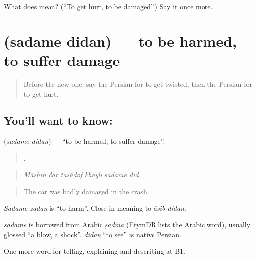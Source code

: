 \begin{tcolorbox}[breakable,colback=teal!4,colframe=teal!35!black,title={Before you move on}]
What does   mean? (\textquotedblleft{}To get hurt, to be damaged\textquotedblright{}.) Say it once more.
\end{tcolorbox}
\section[\texorpdfstring{\fa{صدمه} \fa{دیدن} (sadame didan)}{صدمه دیدن (sadame didan)}]{  (sadame didan) — to be harmed, to suffer damage}

\label{lesson:FA-C325-sadame-didan}



\begin{quote}
Before the new one: say the Persian for to get twisted, then the Persian for to get hurt.
\end{quote}

\subsection*{You'll want to know:  }
\textbf{ } (\emph{sadame didan}) — \textquotedblleft{}to be harmed, to suffer damage\textquotedblright{}.

\begin{quote}
     .
\end{quote}

\begin{quote}
\emph{Mâshin dar tasâdof kheyli sadame did.}
\end{quote}

\begin{quote}
The car was badly damaged in the crash.
\end{quote}

\emph{Sadame zadan} is \textquotedblleft{}to harm\textquotedblright{}. Close in meaning to \emph{âsib didan}.

\begin{cousinweb}
\emph{sadame} is borrowed from Arabic \emph{ṣadma} (EtymDB lists the Arabic word), usually glossed \textquotedblleft{}a blow, a shock\textquotedblright{}. \emph{didan} \textquotedblleft{}to see\textquotedblright{} is native Persian.
\end{cousinweb}

\begin{grammarlens}[title={What you've built}]
One more word for telling, explaining and describing at B1.
\end{grammarlens}

